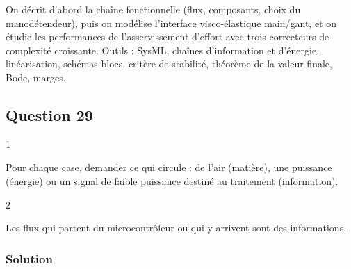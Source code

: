 \documentclass[11pt,a4paper]{article}
\begin{document}
On décrit d'abord la chaîne fonctionnelle (flux, composants, choix du manodétendeur), puis on modélise l'interface visco-élastique main/gant, et on étudie les performances de l'asservissement d'effort avec trois correcteurs de complexité croissante. Outils : SysML, chaînes d'information et d'énergie, linéarisation, schémas-blocs, critère de stabilité, théorème de la valeur finale, Bode, marges.

\hypertarget{question-29}{%
\subsection{Question 29}\label{question-29}}

\begin{indication}{1}

Pour chaque case, demander ce qui circule : de l'air (matière), une puissance (énergie) ou un signal de faible puissance destiné au traitement (information).

\end{indication}

\begin{indication}{2}

Les flux qui partent du microcontrôleur ou qui y arrivent sont des informations.

\end{indication}

\hypertarget{solution-28}{%
\subsubsection{Solution}\label{solution-28}}
\end{document}
